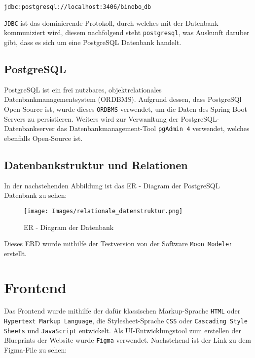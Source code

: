 \documentclass[paper=a4,12pt]{scrreprt}
\begin{document}
\texttt{jdbc:postgresql://localhost:3406/binobo$\_$db}\newline

\texttt{JDBC} ist das dominierende Protokoll, durch welches mit der Datenbank kommuniziert wird, diesem nachfolgend steht \texttt{postgresql}, was Auskunft darüber gibt, dass es sich um eine PostgreSQL Datenbank handelt.\newline

\pagebreak
\subsection{PostgreSQL}

PostgreSQL ist ein frei nutzbares, objektrelationales Datenbankmanagementsystem (ORDBMS)\cite{postgres}. Aufgrund dessen, dass PostgreSQl Open-Source ist, wurde dieses \texttt{ORDBMS} verwendet, um die Daten des Spring Boot Servers zu persistieren.\newline
Weiters wird zur Verwanltung der PostgreSQL-Datenbankserver das Datenbankmanagement-Tool \texttt{pgAdmin 4} verwendet, welches ebenfalls Open-Source ist.\newline

\subsection{Datenbankstruktur und Relationen}
\label{sec:relations}

In der nachstehenden Abbildung ist das ER - Diagram der PostgreSQL Datenbank zu sehen:\newline

\begin{figure}[H]
  \centering
  \texttt{[image: Images/relationale\_datenstruktur.png]}
  \caption{ER - Diagram der Datenbank}
\end{figure}

Dieses ERD wurde mithilfe der Testversion von der Software \texttt{Moon Modeler}\cite{moon_modeler} erstellt.\newline

\section{Frontend}

Das Frontend wurde mithilfe der dafür klassischen Markup-Sprache \texttt{HTML} oder \texttt{Hypertext Markup Language}, die Stylesheet-Sprache \texttt{CSS} oder \texttt{Cascading Style Sheets} und \texttt{JavaScript} entwickelt.\newline
Als UI-Entwicklungstool zum erstellen der Blueprints der Website wurde \texttt{Figma} verwendet. Nachstehend ist der Link zu dem Figma-File zu sehen:\newline
\end{document}

